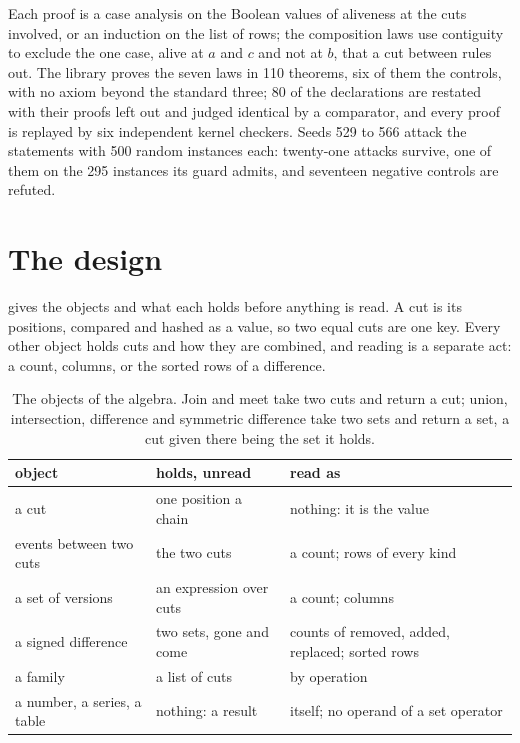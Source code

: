 \documentclass[11pt]{article}
\theoremstyle{plain}
\theoremstyle{definition}
\begin{document}
Each proof is a case analysis on the Boolean values of aliveness at the cuts involved, or an
induction on the list of rows; the composition laws use contiguity to exclude the one case,
alive at $a$ and $c$ and not at $b$, that a cut between rules out. The library proves the seven
laws in 110 theorems, six of them the controls, with no axiom beyond the standard three; 80 of
the declarations are restated with their proofs left out and judged identical by a comparator,
and every proof is replayed by six independent kernel checkers. Seeds 529 to 566 attack the
statements with 500 random instances each: twenty-one attacks survive, one of them on the 295
instances its guard admits, and seventeen negative controls are refuted.

\section{The design}\label{sec:design}

 gives the objects and what each holds before anything is read. A cut is its
positions, compared and hashed as a value, so two equal cuts are one key. Every other object holds
cuts and how they are combined, and reading is a separate act: a count, columns, or the sorted
rows of a difference.

\begin{table}[t]
\centering\small
\begin{tabularx}{\linewidth}{@{}lXX@{}}
\toprule
object & holds, unread & read as \\
\midrule
a cut & one position a chain & nothing: it is the value \\
events between two cuts & the two cuts & a count; rows of every kind \\
a set of versions & an expression over cuts & a count; columns \\
a signed difference & two sets, gone and come & counts of removed, added, replaced; sorted rows \\
a family & a list of cuts & by operation \\
a number, a series, a table & nothing: a result & itself; no operand of a set operator \\
\bottomrule
\end{tabularx}
\caption{The objects of the algebra. Join and meet take two cuts and return a cut; union,
intersection, difference and symmetric difference take two sets and return a set, a cut given
there being the set it holds.}\label{tab:objects}
\end{table}
\end{document}
